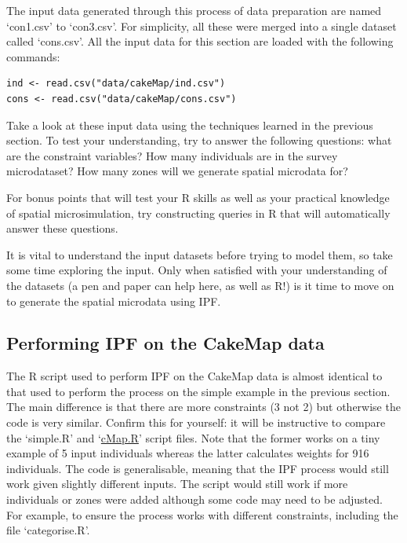 \documentclass[a4paper, 11pt, twoside]{article}
\begin{document}
The input data generated through this process of data preparation are named
`con1.csv' to `con3.csv'. For simplicity, all these were merged into a single
dataset called `cons.csv'. All the input data for this section
are loaded with the following commands:


\begin{lstlisting}[float=h, caption={Loading the input data for CakeMap (see `cMap.R')}]
ind <- read.csv("data/cakeMap/ind.csv")
cons <- read.csv("data/cakeMap/cons.csv")
\end{lstlisting}

Take a look at these input data using the techniques learned in the previous
section. To test your understanding, try to answer the following questions:
what are the constraint variables? How many individuals are in the survey microdataset?
How many zones will we generate spatial microdata for?

For bonus points that will test your R skills as well as your practical knowledge
of spatial microsimulation, try constructing queries in R that will automatically
answer these questions.

It is vital to understand the input datasets before trying to model them, so
take some time exploring the input. Only when satisfied with your understanding of
the datasets (a pen and paper can help here, as well as R!) is it time
to move on to generate the spatial microdata using IPF.

\subsection{Performing IPF on the CakeMap data}
\label{sipfcake}
The R script used to perform IPF on the CakeMap data is almost identical to
that used to perform the process on the simple example in the previous section.
The main difference is that there are more constraints (3 not 2) but otherwise
the code is very similar.  Confirm this for yourself: it will be instructive
to compare the `simple.R' and
`\href{https://github.com/Robinlovelace/smsim-course/blob/master/cMap.R}{cMap.R}'
script files. Note that
the former works on a tiny example of 5 input individuals whereas the latter
calculates weights for 916 individuals. The code is generalisable, meaning
that the IPF process would still work given slightly different inputs.
The script would still work if more individuals or zones were added although
some code may need to be adjusted. For example, to ensure the process works with different
constraints, including the file `categorise.R'.
\end{document}
